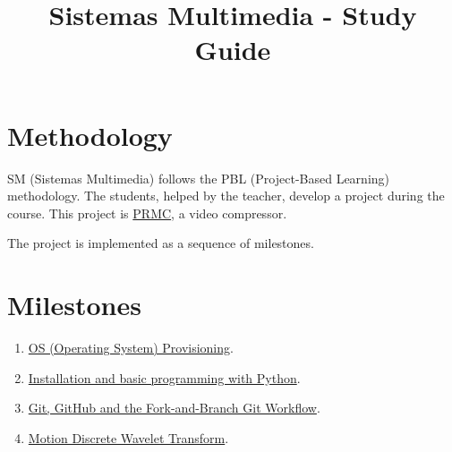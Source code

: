 \title{Sistemas Multimedia - Study Guide}

\maketitle

\section{Methodology}
SM (Sistemas Multimedia) follows the PBL (Project-Based Learning) methodology. The students,
helped by the teacher, develop a project during the course. This
project
is \href{https://github.com/Sistemas-Multimedia/PRMC}{PRMC},
a video compressor.

The project is implemented as a sequence of milestones.

\section{Milestones}
\begin{enumerate}
\item \href{https://sistemas-multimedia.github.io/study_guide/provisioning/}{OS (Operating System) Provisioning}.
\item \href{https://sistemas-multimedia.github.io/study_guide/python/}{Installation and basic programming with Python}.
\item \href{https://sistemas-multimedia.github.io/study_guide/git/}{Git, GitHub and the Fork-and-Branch Git Workflow}.
\item \href{https://sistemas-multimedia.github.io/study_guide/MDWT/}{Motion Discrete Wavelet Transform}.
\end{enumerate}


